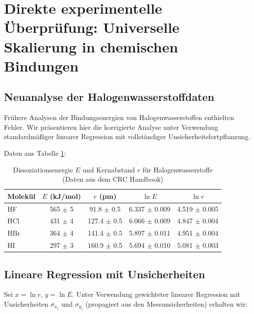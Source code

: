 \documentclass[12pt,a4paper]{article}
\begin{document}
	\section{Direkte experimentelle Überprüfung: Universelle Skalierung in chemischen Bindungen}
	\label{sec:experimental-verification}
	
	\subsection{Neuanalyse der Halogenwasserstoffdaten}
	
	Frühere Analysen der Bindungsenergien von Halogenwasserstoffen enthielten Fehler. Wir präsentieren hier die korrigierte Analyse unter Verwendung standardmäßiger linearer Regression mit vollständiger Unsicherheitsfortpflanzung.
	
	Daten aus Tabelle \ref{tab:HX}:
	
	\begin{table}[htbp]
		\centering
		\caption{Dissoziationsenergie $E$ und Kernabstand $r$ für Halogenwasserstoffe (Daten aus dem CRC Handbook)}
		\label{tab:HX}
		\begin{tabular}{lcccc}
			\toprule
			Molekül & $E$ (kJ/mol) & $r$ (pm) & $\ln E$ & $\ln r$ \\
			\midrule
			HF & 565 $\pm$ 5 & 91.8 $\pm$ 0.5 & 6.337 $\pm$ 0.009 & 4.519 $\pm$ 0.005 \\
			HCl & 431 $\pm$ 4 & 127.4 $\pm$ 0.5 & 6.066 $\pm$ 0.009 & 4.847 $\pm$ 0.004 \\
			HBr & 364 $\pm$ 4 & 141.4 $\pm$ 0.5 & 5.897 $\pm$ 0.011 & 4.951 $\pm$ 0.004 \\
			HI  & 297 $\pm$ 3 & 160.9 $\pm$ 0.5 & 5.694 $\pm$ 0.010 & 5.081 $\pm$ 0.003 \\
			\bottomrule
		\end{tabular}
	\end{table}
	
	\subsection{Lineare Regression mit Unsicherheiten}
	
	Sei $x = \ln r$, $y = \ln E$. Unter Verwendung gewichteter linearer Regression mit Unsicherheiten $\sigma_{x_i}$ und $\sigma_{y_i}$ (propagiert aus den Messunsicherheiten) erhalten wir:
	
\end{document}
